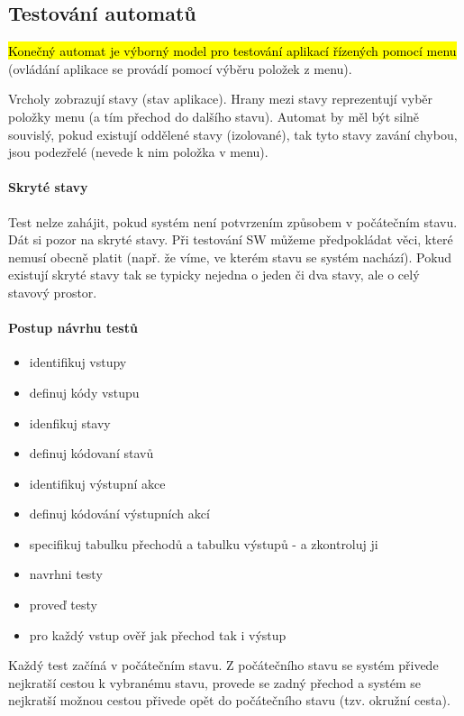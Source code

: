 \subsection{Testování automatů}
\hl{Konečný automat je výborný model pro testování aplikací řízených pomocí menu} (ovládání aplikace se provádí pomocí výběru položek z menu).

Vrcholy zobrazují stavy (stav aplikace). Hrany mezi stavy reprezentují vyběr položky menu (a tím přechod do dalšího stavu). Automat by měl být silně souvislý, pokud existují oddělené stavy (izolované), tak tyto stavy zavání chybou, jsou podezřelé (nevede k nim položka v menu).

\vspace{-10px}

\paragraph{Skryté stavy}
Test nelze zahájit, pokud systém není potvrzením způsobem v počátečním stavu. Dát si pozor na skryté stavy. Při testování SW můžeme předpokládat věci, které nemusí obecně platit (např. že víme, ve kterém stavu se systém nachází). Pokud existují skryté stavy tak se typicky nejedna o jeden či dva stavy, ale o celý stavový prostor.

\paragraph{Postup návrhu testů}

\begin{itemize}[itemsep=0px]
\item identifikuj vstupy
\item definuj kódy vstupu
\item idenfikuj stavy
\item definuj kódovaní stavů
\item identifikuj výstupní akce
\item definuj kódování výstupních akcí
\item specifikuj tabulku přechodů a tabulku výstupů - a zkontroluj ji
\item navrhni testy
\item proveď testy
\item pro každý vstup ověř jak přechod tak i výstup
\end{itemize}

Každý test začíná v počátečním stavu. Z počátečního stavu se systém přivede nejkratší cestou k vybranému stavu, provede se zadný přechod a systém se nejkratší možnou cestou přivede opět do počátečního stavu (tzv. okružní cesta).

